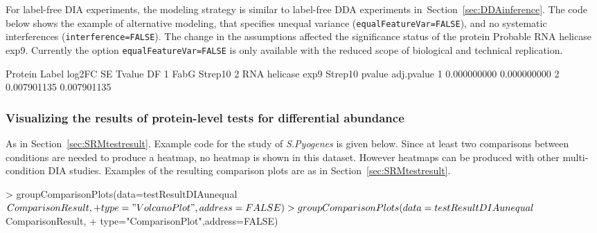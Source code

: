 \documentclass[11pt]{article}
\def\secref#1{Section~\ref{sec:#1}}
\begin{document}
For label-free DIA experiments, the modeling strategy is similar to label-free DDA experiments in~\secref{DDAinference}. The code below shows the example of alternative modeling, that specifies unequal variance ({\tt equalFeatureVar=FALSE}), and no systematic interferences ({\tt interference=FALSE}). The change in the assumptions affected the significance status of the protein Probable RNA helicase exp9. Currently the option {\tt equalFeatureVar=FALSE} is only available with the reduced scope of biological and technical replication.

\begin{small}
\begin{Schunk}
\begin{Soutput}
             Protein       Label     log2FC         SE     Tvalue  DF
1               FabG Strep10%
2 RNA  helicase exp9 Strep10%
       pvalue  adj.pvalue
1 0.000000000 0.000000000
2 0.007901135 0.007901135
\end{Soutput}
\end{Schunk}
\end{small}


\subsubsection{Visualizing the results of protein-level tests for differential abundance}

As in \secref{SRMtestresult}. Example code for the study of {\it S.Pyogenes} is given below. Since at least two comparisons between conditions are needed to produce a heatmap, no heatmap is shown in this dataset. However heatmaps can be produced with other multi-condition DIA studies. Examples of the resulting comparison plots are as in \secref{SRMtestresult}.

\begin{small}
\begin{Schunk}
\begin{Sinput}
> groupComparisonPlots(data=testResultDIAunequal$ComparisonResult,
+                      type="VolcanoPlot",address=FALSE)
> groupComparisonPlots(data=testResultDIAunequal$ComparisonResult,
+                      type="ComparisonPlot",address=FALSE)
\end{Sinput}
\end{Schunk}
\end{small}
\end{document}

